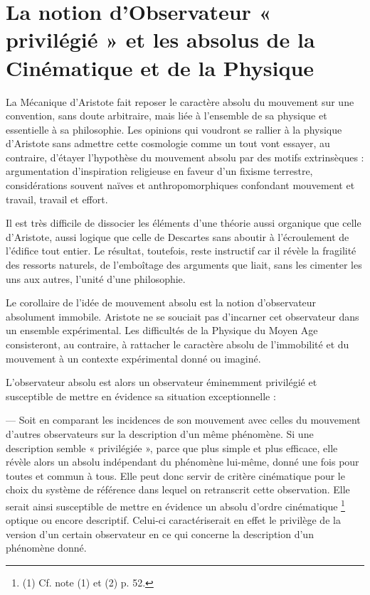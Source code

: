 \section{La notion d’Observateur « privilégié »
et les absolus de la Cinématique et de la Physique}

La Mécanique d’Aristote fait reposer le caractère absolu du mouvement
sur une convention, sans doute arbitraire, mais liée à l’ensemble
de sa physique et essentielle à sa philosophie. Les opinions qui voudront
se rallier à la physique d’Aristote sans admettre cette cosmologie comme
un tout vont essayer, au contraire, d’étayer l’hypothèse du mouvement
absolu par des motifs extrinsèques : argumentation d’inspiration religieuse
en faveur d’un fixisme terrestre, considérations souvent naïves et anthropomorphiques
confondant mouvement et travail, travail et effort.

Il est très difficile de dissocier les éléments d’une théorie aussi organique
que celle d’Aristote, aussi logique que celle de Descartes sans
aboutir à l’écroulement de l’édifice tout entier. Le résultat, toutefois,
reste instructif car il révèle la fragilité des ressorts naturels, de l’emboîtage
des arguments que liait, sans les cimenter les uns aux autres, l’unité d’une
philosophie.

Le corollaire de l’idée de mouvement absolu est la notion d’observateur
absolument immobile. Aristote ne se souciait pas d’incarner cet
observateur dans un ensemble expérimental. Les difficultés de la Physique
du Moyen Age consisteront, au contraire, à rattacher le caractère absolu
de l’immobilité et du mouvement à un contexte expérimental donné ou
imaginé.

L’observateur absolu est alors un observateur éminemment privilégié
et susceptible de mettre en évidence sa situation exceptionnelle :

— Soit en comparant les incidences de son mouvement avec celles du
mouvement d’autres observateurs sur la description d’un même phénomène.
Si une description semble « privilégiée », parce que plus simple et
plus efficace, elle révèle alors un absolu indépendant du phénomène lui-même,
donné une fois pour toutes et commun à tous. Elle peut donc
servir de critère cinématique pour le choix du système de référence dans
lequel on retranscrit cette observation. Elle serait ainsi susceptible de
mettre en évidence un absolu d’ordre cinématique \footnote{(1) Cf. note (1) et (2) p. 52.} optique ou encore
descriptif. Celui-ci caractériserait en effet le privilège de la version d’un
certain observateur en ce qui concerne la description d’un phénomène
donné.

